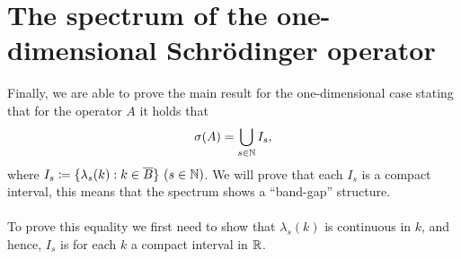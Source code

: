 \chapter{The spectrum of the one-dimensional Schrödinger operator} \label{chap:6}
Finally, we are able to prove the main result for the one-dimensional case stating that for the operator $A$ it holds that
	\begin{equation}
		\sigma(A) = \bigcup_{s \in \mathbb{N}} I_{s}, \label{MainResult}
	\end{equation}
where $I_{s} \coloneqq \{ \lambda_{s}(k) : k \in \overline{B} \} ~(s \in \mathbb{N})$. We will prove that  each $I_{s}$ is a compact interval, this means that the spectrum shows a \enquote{band-gap} structure. 
~\\ ~\\ 
To prove this equality we first need to show that $\lambda_{s}(k)$ is continuous in $k$, and hence, $I_{s}$ is for each $k$ a compact interval in $\mathbb{R}$.

